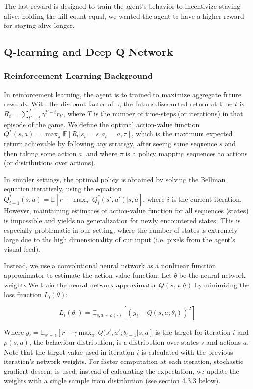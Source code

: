 \documentclass{article}
\begin{document}
\begin{multicols}{2}
The last reward is designed to train the agent's behavior to incentivize staying alive; holding the kill count equal, we wanted the agent to have a higher reward for staying alive longer.

\subsection{Q-learning and Deep Q Network}

\subsubsection{Reinforcement Learning Background}

In reinforcement learning, the agent is to trained to maximize aggregate future rewards. With the discount factor of $\gamma$, the future discounted return at time $t$ is $R_t = \sum_{t' = t}^T \gamma^{t' - t}r_{t'}$, where $T$ is the number of time-steps (or iterations) in that episode of the game.
We define the optimal action-value function
$Q^{*}(s, a) = \max_\pi \mathbb{E}[R_t | s_t = s, a_t = a, \pi]$,
which is the maximum expected return achievable by following any strategy,
after seeing some sequence $s$ and then taking some action $a$, and where $\pi$ is a policy mapping sequences to actions (or distributions over actions).

In simpler settings, the optimal policy is obtained by solving the Bellman equation iteratively, using the equation $Q_{i+1}^*(s,a) = \mathbb{E}[r +  \max_{a'} Q_i^* (s', a' )| s, a]$, where $i$ is the current iteration.
However, maintaining estimates of action-value function for all sequences (states) is impossible and yields no generalization for newly encountered states.
This is especially problematic in our setting, where the number of states is extremely large due to the high dimensionality of our input (i.e. pixels from the agent's visual feed).

Instead, we use a convolutional neural network as a nonlinear function approximator to estimate the action-value function. Let $\theta$ be the neural network weights We train the neural network approximator $Q(s,a,\theta)$ by minimizing the loss function $L_i(\theta)$:

\begin{equation*}
    L_i(\theta_i) = \mathbb{E}_{s,a \sim \rho(·)} [(y_i - Q (s, a; \theta_i))^2]
\end{equation*}


Where $y_i = \mathbb{E}_{s' \sim \epsilon}[r + \gamma \max_{a'} Q(s', a'; \theta_{i-1} | s, a]$ is the target for iteration $i$ and $\rho(s, a)$, the behaviour distribution, is a distribution over states $s$ and actions $a$.
Note that the target value used in iteration $i$ is calculated with the previous iteration's network weights. For faster computation at each iteration, stochastic gradient descent is used; instead of calculating the expectation, we update the weights with a single sample from distribution (see section 4.3.3 below).


\end{multicols}
\end{document}
